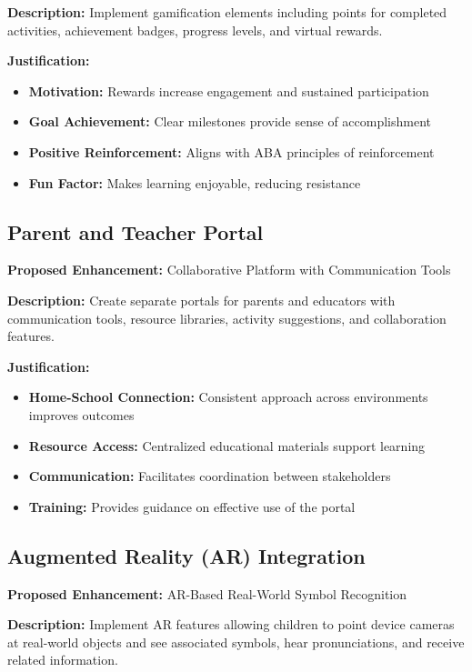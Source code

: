 \documentclass[12pt,a4paper]{article}
\begin{document}
\textbf{Description:}
Implement gamification elements including points for completed activities, achievement badges, progress levels, and virtual rewards.

\textbf{Justification:}
\begin{itemize}
    \item \textbf{Motivation:} Rewards increase engagement and sustained participation
    \item \textbf{Goal Achievement:} Clear milestones provide sense of accomplishment
    \item \textbf{Positive Reinforcement:} Aligns with ABA principles of reinforcement
    \item \textbf{Fun Factor:} Makes learning enjoyable, reducing resistance
\end{itemize}

\subsection{Parent and Teacher Portal}
\textbf{Proposed Enhancement:} Collaborative Platform with Communication Tools

\textbf{Description:}
Create separate portals for parents and educators with communication tools, resource libraries, activity suggestions, and collaboration features.

\textbf{Justification:}
\begin{itemize}
    \item \textbf{Home-School Connection:} Consistent approach across environments improves outcomes
    \item \textbf{Resource Access:} Centralized educational materials support learning
    \item \textbf{Communication:} Facilitates coordination between stakeholders
    \item \textbf{Training:} Provides guidance on effective use of the portal
\end{itemize}

\subsection{Augmented Reality (AR) Integration}
\textbf{Proposed Enhancement:} AR-Based Real-World Symbol Recognition

\textbf{Description:}
Implement AR features allowing children to point device cameras at real-world objects and see associated symbols, hear pronunciations, and receive related information.
\end{document}
